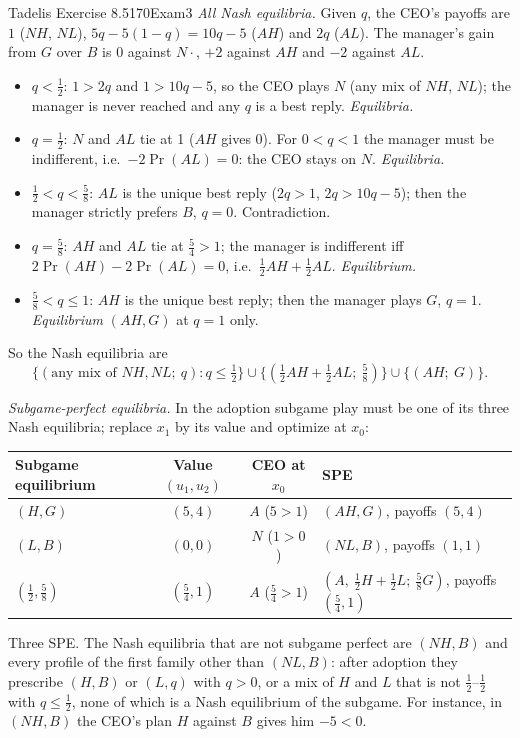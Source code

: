 \begin{exsol}{Tadelis Exercise 8.5}{170}{Exam}{3}
\emph{All Nash equilibria.} Given $q$, the CEO's payoffs are $1$ ($NH$, $NL$), $5q - 5(1-q) = 10q - 5$
($AH$) and $2q$ ($AL$). The manager's gain from $G$ over $B$ is $0$ against $N\cdot$, $+2$ against
$AH$ and $-2$ against $AL$.
\begin{itemize}
  \item $q < \frac12$: $1 > 2q$ and $1 > 10q - 5$, so the CEO plays $N$ (any mix of $NH$, $NL$); the
  manager is never reached and any $q$ is a best reply. \emph{Equilibria.}
  \item $q = \frac12$: $N$ and $AL$ tie at 1 ($AH$ gives 0). For $0 < q < 1$ the manager must be
  indifferent, i.e.\ $-2\Pr(AL) = 0$: the CEO stays on $N$. \emph{Equilibria.}
  \item $\frac12 < q < \frac58$: $AL$ is the unique best reply ($2q > 1$, $2q > 10q - 5$); then the
  manager strictly prefers $B$, $q = 0$. Contradiction.
  \item $q = \frac58$: $AH$ and $AL$ tie at $\frac54 > 1$; the manager is indifferent iff
  $2\Pr(AH) - 2\Pr(AL) = 0$, i.e.\ $\frac12 AH + \frac12 AL$. \emph{Equilibrium.}
  \item $\frac58 < q \le 1$: $AH$ is the unique best reply; then the manager plays $G$, $q = 1$.
  \emph{Equilibrium} $(AH, G)$ at $q = 1$ only.
\end{itemize}
So the Nash equilibria are
\[
  \bigl\{(\text{any mix of } NH, NL;\ q) : q \le \tfrac12\bigr\}
  \cup \bigl\{(\tfrac12 AH + \tfrac12 AL;\ \tfrac58)\bigr\}
  \cup \bigl\{(AH;\ G)\bigr\}.
\]

\emph{Subgame-perfect equilibria.} In the adoption subgame play must be one of its three Nash
equilibria; replace $x_1$ by its value and optimize at $x_0$:
\begin{center}
\begin{tabular}{lccl}
\toprule
Subgame equilibrium & Value $(u_1,u_2)$ & CEO at $x_0$ & SPE \\
\midrule
$(H, G)$ & $(5, 4)$ & $A$ ($5 > 1$) & $(AH, G)$, payoffs $(5,4)$ \\
$(L, B)$ & $(0, 0)$ & $N$ ($1 > 0$) & $(NL, B)$, payoffs $(1,1)$ \\
$(\frac12, \frac58)$ & $(\frac54, 1)$ & $A$ ($\frac54 > 1$) & $(A,\ \frac12 H + \frac12 L;\ \frac58 G)$, payoffs $(\frac54, 1)$ \\
\bottomrule
\end{tabular}
\end{center}
Three SPE. The Nash equilibria that are not subgame perfect are $(NH, B)$ and every profile of the
first family other than $(NL, B)$: after adoption they prescribe $(H, B)$ or $(L, q)$ with
$q > 0$, or a mix of $H$ and $L$ that is not $\frac12$--$\frac12$ with $q \le \frac12$, none of
which is a Nash equilibrium of the subgame. For instance, in $(NH, B)$ the CEO's plan $H$ against
$B$ gives him $-5 < 0$.


\end{exsol}

